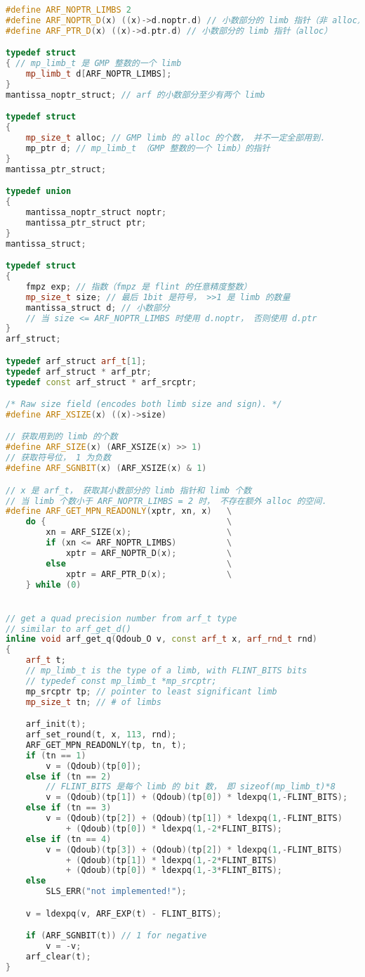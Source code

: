 \begin{lstlisting}[language=cpp]
#define ARF_NOPTR_LIMBS 2
#define ARF_NOPTR_D(x) ((x)->d.noptr.d) // 小数部分的 limb 指针（非 alloc）
#define ARF_PTR_D(x) ((x)->d.ptr.d) // 小数部分的 limb 指针（alloc）

typedef struct
{ // mp_limb_t 是 GMP 整数的一个 limb
    mp_limb_t d[ARF_NOPTR_LIMBS];
}
mantissa_noptr_struct; // arf 的小数部分至少有两个 limb

typedef struct
{
    mp_size_t alloc; // GMP limb 的 alloc 的个数， 并不一定全部用到．
    mp_ptr d; // mp_limb_t （GMP 整数的一个 limb）的指针
}
mantissa_ptr_struct;

typedef union
{
    mantissa_noptr_struct noptr;
    mantissa_ptr_struct ptr;
}
mantissa_struct;

typedef struct
{
    fmpz exp; // 指数（fmpz 是 flint 的任意精度整数）
    mp_size_t size; // 最后 1bit 是符号， >>1 是 limb 的数量
    mantissa_struct d; // 小数部分
	// 当 size <= ARF_NOPTR_LIMBS 时使用 d.noptr， 否则使用 d.ptr
}
arf_struct;

typedef arf_struct arf_t[1];
typedef arf_struct * arf_ptr;
typedef const arf_struct * arf_srcptr;

/* Raw size field (encodes both limb size and sign). */
#define ARF_XSIZE(x) ((x)->size)

// 获取用到的 limb 的个数
#define ARF_SIZE(x) (ARF_XSIZE(x) >> 1)
// 获取符号位， 1 为负数
#define ARF_SGNBIT(x) (ARF_XSIZE(x) & 1)

// x 是 arf_t， 获取其小数部分的 limb 指针和 limb 个数
// 当 limb 个数小于 ARF_NOPTR_LIMBS = 2 时， 不存在额外 alloc 的空间．
#define ARF_GET_MPN_READONLY(xptr, xn, x)   \
    do {                                    \
        xn = ARF_SIZE(x);                   \
        if (xn <= ARF_NOPTR_LIMBS)          \
            xptr = ARF_NOPTR_D(x);          \
        else                                \
            xptr = ARF_PTR_D(x);            \
    } while (0)


// get a quad precision number from arf_t type
// similar to arf_get_d()
inline void arf_get_q(Qdoub_O v, const arf_t x, arf_rnd_t rnd)
{
	arf_t t;
	// mp_limb_t is the type of a limb, with FLINT_BITS bits
	// typedef const mp_limb_t *mp_srcptr;
	mp_srcptr tp; // pointer to least significant limb
	mp_size_t tn; // # of limbs

	arf_init(t);
	arf_set_round(t, x, 113, rnd);
	ARF_GET_MPN_READONLY(tp, tn, t);
	if (tn == 1)
		v = (Qdoub)(tp[0]);
	else if (tn == 2)
	    // FLINT_BITS 是每个 limb 的 bit 数， 即 sizeof(mp_limb_t)*8
		v = (Qdoub)(tp[1]) + (Qdoub)(tp[0]) * ldexpq(1,-FLINT_BITS);
	else if (tn == 3)
		v = (Qdoub)(tp[2]) + (Qdoub)(tp[1]) * ldexpq(1,-FLINT_BITS)
		    + (Qdoub)(tp[0]) * ldexpq(1,-2*FLINT_BITS);
	else if (tn == 4)
		v = (Qdoub)(tp[3]) + (Qdoub)(tp[2]) * ldexpq(1,-FLINT_BITS)
		    + (Qdoub)(tp[1]) * ldexpq(1,-2*FLINT_BITS)
			+ (Qdoub)(tp[0]) * ldexpq(1,-3*FLINT_BITS);
	else
		SLS_ERR("not implemented!");

	v = ldexpq(v, ARF_EXP(t) - FLINT_BITS);

	if (ARF_SGNBIT(t)) // 1 for negative
		v = -v;
	arf_clear(t);
}
\end{lstlisting}

